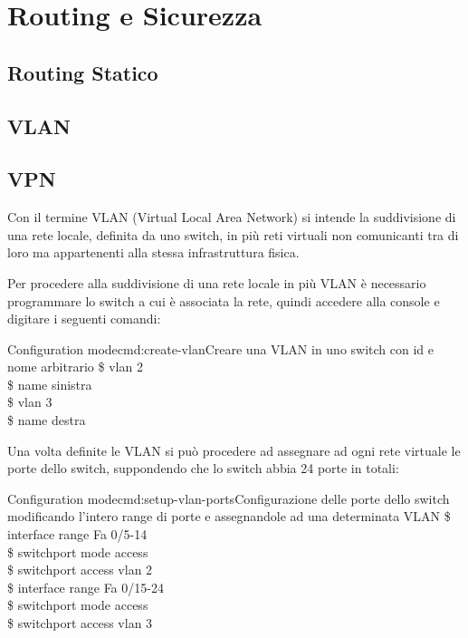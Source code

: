 \section{Routing e Sicurezza}
\subsection{Routing Statico}
\subsection{VLAN}
\subsection{VPN}
Con il termine VLAN (Virtual Local Area Network) si intende la suddivisione di una rete locale, definita da uno switch, in più reti virtuali non comunicanti tra di loro ma appartenenti alla stessa infrastruttura fisica.

Per procedere alla suddivisione di una rete locale in più VLAN è necessario programmare lo switch a cui è associata la rete, quindi accedere alla console e digitare i seguenti comandi:

\begin{cmds}[Switch]{Configuration mode}{cmd:create-vlan}{Creare una VLAN in uno switch con \textcolor{Highlight1}{id} e \textcolor{Highlight2}{nome} arbitrario}
    \$ vlan \textcolor{Highlight1}{2}\\
    \$ name \textcolor{Highlight2}{sinistra}\\
    \$ vlan \textcolor{Highlight1}{3}\\
    \$ name \textcolor{Highlight2}{destra}
\end{cmds}

Una volta definite le VLAN si può procedere ad assegnare ad ogni rete virtuale le porte dello switch, suppondendo che lo switch abbia 24 porte in totali:

\begin{cmds}{Configuration mode}{cmd:setup-vlan-ports}{Configurazione delle porte dello switch modificando l'intero \textcolor{Highlight1}{range} di porte e assegnandole ad una \textcolor{Highlight2}{determinata VLAN}}
    \$ interface range \textcolor{Highlight1}{Fa 0/5-14}\\
    \$ switchport mode access\\
    \$ switchport access \textcolor{Highlight2}{vlan 2}\\
    \$ interface range \textcolor{Highlight1}{Fa 0/15-24}\\
    \$ switchport mode access\\
    \$ switchport access \textcolor{Highlight2}{vlan 3}
\end{cmds}

